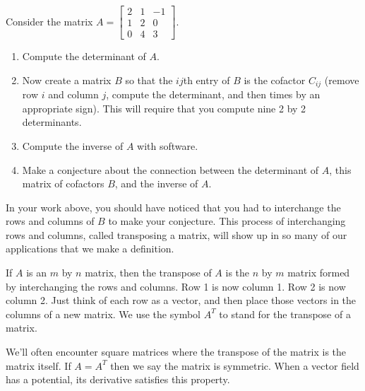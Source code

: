 \begin{problem}
Consider the matrix
$A=\begin{bmatrix}
2&1&-1\\1&2&0\\0&4&3 
\end{bmatrix}.$
\begin{enumerate}
 \item 
 Compute the determinant of $A$. 
 \item 
{}%
Now create a matrix $B$ so that the $ij$th entry of $B$ is the cofactor $C_{ij}$ (remove row $i$ and column $j$, compute the determinant, and then times by an appropriate sign).  
This will require that you compute nine 2 by 2 determinants.  
 \item 
Compute the inverse of $A$ with software. 
 \item 
Make a conjecture about the connection between the determinant of $A$, this matrix of cofactors $B$, and the inverse of $A$.  
\end{enumerate}
\end{problem}


In your work above, you should have noticed that you had to interchange the rows and columns of $B$ to make your conjecture.  This process of interchanging rows and columns, called transposing a matrix, will show up in so many of our applications that we make a definition.

\begin{definition}
 If $A$ is an $m$ by $n$ matrix, then the transpose of $A$ is the $n$ by $m$ matrix formed by interchanging the rows and columns.  Row 1 is now column 1. Row 2 is now column 2.  Just think of each row as a vector, and then place those vectors in the columns of a new matrix.  We use the symbol $A^T$ to stand for the transpose of a matrix.

We'll often encounter square matrices where the transpose of the matrix is the matrix itself.  If $A=A^T$ then we say the matrix is symmetric. When a vector field has a potential, its derivative satisfies this property. 
\end{definition}









